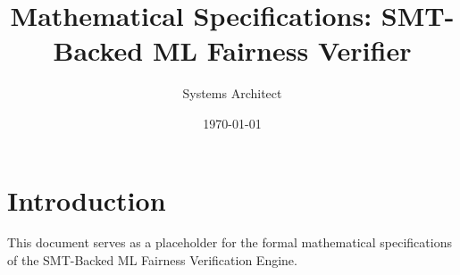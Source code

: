 \documentclass{article}
\begin{document}
\title{Mathematical Specifications: SMT-Backed ML Fairness Verifier}
\author{Systems Architect}
\date{\today}
\maketitle

\section{Introduction}
This document serves as a placeholder for the formal mathematical specifications of the SMT-Backed ML Fairness Verification Engine.
\end{document}
